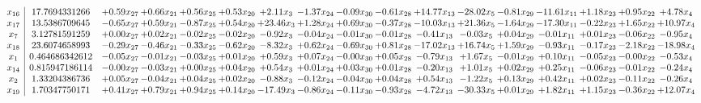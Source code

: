 \documentclass[9pt]{article}
\begin{document}
 \[\begin{array}{c| c c@{\hskip 2pt} c@{\hskip 2pt} c@{\hskip 2pt} c@{\hskip 2pt} c@{\hskip 2pt} c@{\hskip 2pt} c@{\hskip 2pt} c@{\hskip 2pt} c@{\hskip 2pt} c@{\hskip 2pt} c@{\hskip 2pt} c@{\hskip 2pt} c@{\hskip 2pt} c@{\hskip 2pt} c@{\hskip 2pt} }
 x_{16}   &  17.7694331266 & +  0.59 x_{27} & +  0.66 x_{21} & +  0.56 x_{25} & +  0.53 x_{20} & +  2.11 x_{3} & -1.37 x_{24} & -0.09 x_{30} & -0.61 x_{28} & + 14.77 x_{13} & -28.02 x_{5} & -0.81 x_{29} & -11.61 x_{11} & +  1.18 x_{23} & +  0.95 x_{22} & +  4.78 x_{4}\\
 x_{17}   &  13.5386709645 & -0.65 x_{27} & +  0.59 x_{21} & -0.87 x_{25} & +  0.54 x_{20} & + 23.46 x_{3} & +  1.28 x_{24} & +  0.69 x_{30} & -0.37 x_{28} & -10.03 x_{13} & + 21.36 x_{5} & -1.64 x_{29} & -17.30 x_{11} & -0.22 x_{23} & +  1.65 x_{22} & + 10.97 x_{4}\\
 x_{7}   &  3.12781591259 & +  0.00 x_{27} & +  0.02 x_{21} & -0.02 x_{25} & -0.02 x_{20} & -0.92 x_{3} & -0.04 x_{24} & -0.01 x_{30} & -0.01 x_{28} & -0.41 x_{13} & -0.03 x_{5} & +  0.04 x_{29} & -0.01 x_{11} & +  0.01 x_{23} & -0.06 x_{22} & -0.95 x_{4}\\
 x_{18}   &  23.6074658993 & -0.29 x_{27} & -0.46 x_{21} & -0.33 x_{25} & -0.62 x_{20} & -8.32 x_{3} & +  0.62 x_{24} & -0.69 x_{30} & +  0.81 x_{28} & -17.02 x_{13} & + 16.74 x_{5} & +  1.59 x_{29} & -0.93 x_{11} & -0.17 x_{23} & -2.18 x_{22} & -18.98 x_{4}\\
 x_{1}   &  0.464686342612 & -0.05 x_{27} & -0.01 x_{21} & -0.03 x_{25} & +  0.01 x_{20} & +  0.59 x_{3} & +  0.07 x_{24} & -0.00 x_{30} & +  0.05 x_{28} & -0.79 x_{13} & +  1.67 x_{5} & -0.01 x_{29} & +  0.10 x_{11} & -0.05 x_{23} & -0.00 x_{22} & -0.53 x_{4}\\
 x_{14}   &  0.815947186114 & -0.00 x_{27} & -0.03 x_{21} & +  0.00 x_{25} & +  0.04 x_{20} & +  0.54 x_{3} & +  0.01 x_{24} & +  0.03 x_{30} & +  0.01 x_{28} & -0.20 x_{13} & +  1.01 x_{5} & +  0.02 x_{29} & +  0.25 x_{11} & -0.06 x_{23} & -0.01 x_{22} & -0.24 x_{4}\\
 x_{2}   &  1.33204386736 & +  0.05 x_{27} & -0.04 x_{21} & +  0.04 x_{25} & +  0.02 x_{20} & -0.88 x_{3} & -0.12 x_{24} & -0.04 x_{30} & +  0.04 x_{28} & +  0.54 x_{13} & -1.22 x_{5} & +  0.13 x_{29} & +  0.42 x_{11} & +  0.02 x_{23} & -0.11 x_{22} & -0.26 x_{4}\\
 x_{19}   &  1.70347750171 & +  0.41 x_{27} & +  0.79 x_{21} & +  0.94 x_{25} & +  0.14 x_{20} & -17.49 x_{3} & -0.86 x_{24} & -0.11 x_{30} & -0.93 x_{28} & -4.72 x_{13} & -30.33 x_{5} & +  0.01 x_{29} & +  1.82 x_{11} & +  1.15 x_{23} & -0.36 x_{22} & + 12.07 x_{4}\\

\end{array}\]
\end{document}
